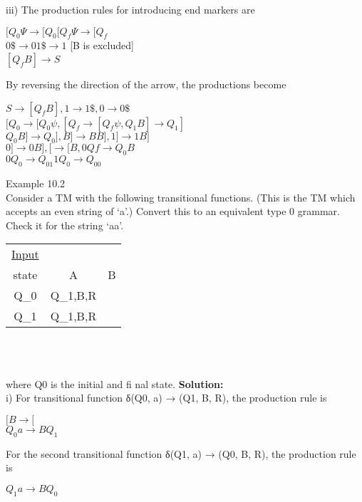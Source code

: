\documentclass[b5paper,10pt]{article}
\begin{document}
iii) The production rules for introducing end markers are
\begin{center}
$[Q_0\Psi \rightarrow [Q_0 [Q_f\Psi \rightarrow [Q_f$\\
$0\$\rightarrow 0 1\$ \rightarrow 1$ [B is excluded]\\
$[Q_fB] \rightarrow S $\\
\end{center}

By reversing the direction of the arrow, the productions become
\begin{center}
$S \rightarrow [Q_f B], 1 \rightarrow 1\$ , 0 \rightarrow 0\$ $\\
$[Q_0 \rightarrow[Q_0ψ, [Q_f \rightarrow[Q_fψ, Q_1B] \rightarrow Q_1]$\\
$Q_0B] \rightarrow Q_0], B] \rightarrow BB], 1] \rightarrow 1B]$\\
$0] \rightarrow 0B], [ \rightarrow [B, 0Qf \rightarrow Q_0B$\\
$0Q_0 \rightarrow Q_01 1Q_0 \rightarrow Q_00$\\
\end{center}

Example 10.2\\

\quad Consider a TM with the following transitional functions. (This is the TM which accepts an even string of ‘a’.) Convert this to an equivalent type 0 grammar. Check it for the string ‘aa’.
\begin{table}[htp]
\centering 
\begin{tabular}{c c c }
     \hline
     \underline{Input}   &       &        \\
     state & A  &  B \\
     \hline
     Q_0 &  Q_1,B,R &  \\
     Q_1  & Q_1,B,R & \\
     \hline
\end{tabular}\\
\end{table}\\
where Q0 is the initial and fi nal state.
\textbf{Solution:}\\

i) For transitional function δ(Q0, a) → (Q1, B, R), the production rule is
\begin{center}
$[B \rightarrow [$\\
$Q_0 a \rightarrow BQ_1$\\
\end{center}
For the second transitional function δ(Q1, a) → (Q0, B, R), the production rule is
\begin{center}
$Q_1 a \rightarrow BQ_0$\\
\end{center}
\end{document}
